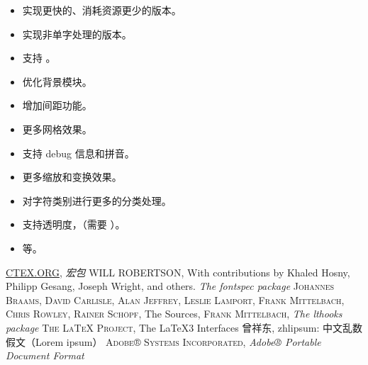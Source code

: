 \documentclass{ctxdoc}
\begin{document}
\begin{itemize}
  \item 实现更快的、消耗资源更少的版本。
  \item 实现非单字处理的版本。
  \item 支持 \LuaTeX。
  \item 优化背景模块。
  \item 增加间距功能。
  \item 更多网格效果。
  \item 支持 debug 信息和拼音。
  \item 更多缩放和变换效果。
  \item 对字符类别进行更多的分类处理。
  \item 支持透明度，（需要 ）。
  \item 等。
\end{itemize}


\begin{thebibliography}{9}
\href{http://www.ctex.org}{CTEX.ORG},
\newblock \textit{ 宏包}
\textsc{WILL ROBERTSON},
\newblock With contributions by Khaled Hosny, Philipp Gesang, Joseph Wright, and others.
\newblock \textit{The fontspec package}
\textsc{Johannes Braams,
David Carlisle,
Alan Jeffrey,
Leslie Lamport,
Frank Mittelbach,
Chris Rowley,
Rainer Schöpf},
\newblock The {\LaTeXe} Sources,
\textsc{Frank Mittelbach},
\newblock \textit{The lthooks package}
\textsc{The {\LaTeX} Project},
\newblock The {\LaTeX3} Interfaces
{\kaishu 曾祥东},
\newblock zhlipsum: 中文乱数假文（Lorem ipsum）
\textsc{Adobe® Systems Incorporated},
\newblock \textit{Adobe® Portable Document Format}
\end{thebibliography}

\IndexLayout
\zitiebackground[off]
\PrintChanges
\PrintIndex
\end{document}
